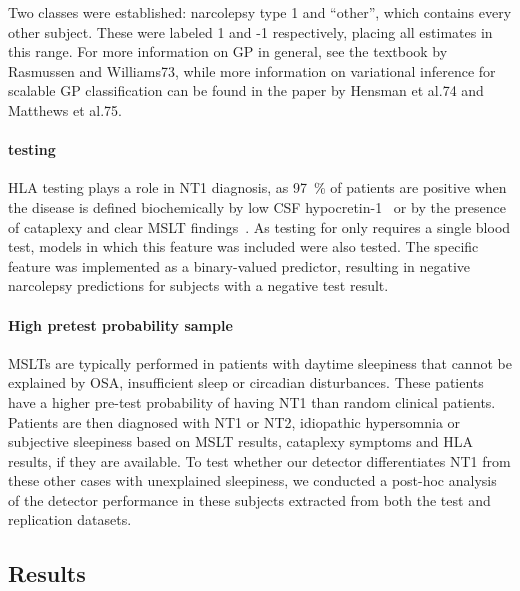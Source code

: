 Two classes were established: narcolepsy type 1 and “other”, which contains every other subject.
These were labeled 1 and -1 respectively, placing all estimates in this range.
For more information on GP in general, see the textbook by Rasmussen and Williams73, while more information on variational inference for scalable GP classification can be found in the paper by Hensman et al.74 and Matthews et al.75.

\paragraph{\hla testing}
\ac{HLA} testing plays a role in \ac{NT1} diagnosis, as \SI{97}{\percent} of patients are \hla positive when the disease is defined biochemically by low \ac{CSF} hypocretin-1~\cite{Han2014} or by the presence of cataplexy and clear \ac{MSLT} findings~\cite{Andlauer2013}.
As testing for \hla only requires a single blood test, models in which this feature was included were also tested. 
The specific feature was implemented as a binary-valued predictor, resulting in negative narcolepsy predictions for subjects with a negative \hla test result.

\paragraph{High pretest probability sample} \Acp{MSLT} are typically performed in patients with daytime sleepiness that cannot be explained by \ac{OSA}, insufficient sleep or circadian disturbances. 
These patients have a higher pre-test probability of having \ac{NT1} than random clinical patients.
Patients are then diagnosed with \ac{NT1} or \ac{NT2}, idiopathic hypersomnia or subjective sleepiness based on \ac{MSLT} results, cataplexy symptoms and \ac{HLA} results, if they are available.
To test whether our detector differentiates \ac{NT1} from these other cases with unexplained sleepiness, we conducted a post-hoc analysis of the detector performance in these subjects extracted from both the test and replication datasets.

\subsection{Results}

